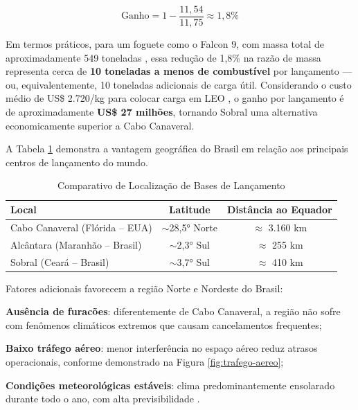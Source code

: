 \begin{equation}
\label{eq:ganho-massa}
\text{Ganho} = 1 - \frac{11{,}54}{11{,}75} \approx 1{,}8\%
\end{equation}

Em termos práticos, para um foguete como o Falcon 9, com massa total de aproximadamente 549 toneladas \cite{spacex2023}, essa redução de 1,8\% na razão de massa representa cerca de \textbf{10 toneladas a menos de combustível} por lançamento --- ou, equivalentemente, 10 toneladas adicionais de carga útil. Considerando o custo médio de US\$ 2.720/kg para colocar carga em LEO \cite{spacex2023}, o ganho por lançamento é de aproximadamente \textbf{US\$ 27 milhões}, tornando Sobral uma alternativa economicamente superior a Cabo Canaveral.

A Tabela \ref{tab:lancamento-foguetes} demonstra a vantagem geográfica do Brasil em relação aos principais centros de lançamento do mundo.

\begin{table}[htb]
    \centering
    \caption{Comparativo de Localização de Bases de Lançamento}
    \label{tab:lancamento-foguetes}
    \begin{tabular}{lcc}
        \toprule
        \textbf{Local} & \textbf{Latitude} & \textbf{Distância ao Equador} \\
        \midrule
        Cabo Canaveral (Flórida -- EUA) & $\sim$28,5° Norte & $\approx$ 3.160 km \\
        Alcântara (Maranhão -- Brasil) & $\sim$2,3° Sul & $\approx$ 255 km \\
        Sobral (Ceará -- Brasil) & $\sim$3,7° Sul & $\approx$ 410 km \\
        \bottomrule
    \end{tabular}
\end{table}

Fatores adicionais favorecem a região Norte e Nordeste do Brasil:

\begin{alineas}
    \item \textbf{Ausência de furacões}: diferentemente de Cabo Canaveral, a região não sofre com fenômenos climáticos extremos que causam cancelamentos frequentes;
    \item \textbf{Baixo tráfego aéreo}: menor interferência no espaço aéreo reduz atrasos operacionais, conforme demonstrado na Figura \ref{fig:trafego-aereo};
    \item \textbf{Condições meteorológicas estáveis}: clima predominantemente ensolarado durante todo o ano, com alta previsibilidade \cite{inmet2023, funceme2022}.
\end{alineas}

